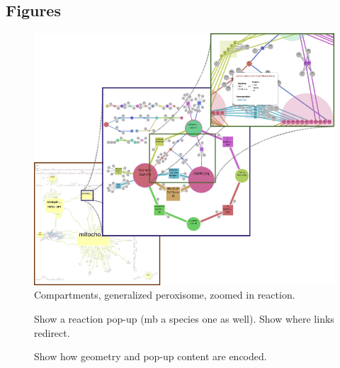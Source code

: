 \documentclass{bmcart}
\begin{document}
\begin{backmatter}

\section*{Figures}
  \begin{figure}[h!]
  \includegraphics[scale=0.5]{figure1.png}
  \caption{
  \label{zoom_levels}
      Compartments, generalized peroxisome, zoomed in reaction.}
      \end{figure}

\begin{figure}[h!]
  \caption{
  \label{pop_up}
      Show a reaction pop-up (mb a species one as well). Show where links redirect.}
      \end{figure}
      
\begin{figure}[h!]
  \caption{
  \label{geojson}
      Show how geometry and pop-up content are encoded.}
      \end{figure}



\end{backmatter}
\end{document}
